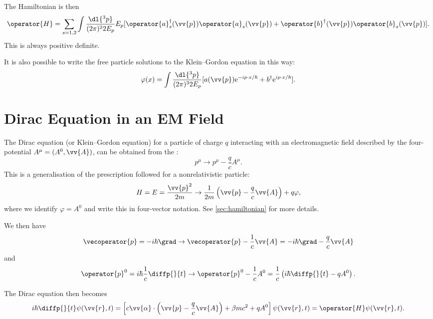 \documentclass[fleqn]{NotesClass}
\newcommand*{\e}{\mathrm{e}}
\newcommand*{\hermit}{\dagger}
\newcommand*{\hamiltonian}{H}
\begin{document}
    The Hamiltonian is then
    \begin{equation}
        \operator{\hamiltonian} = \sum_{s = 1, 2} \int \frac{\dl{^3p}}{(2\pi)^2 2E_p} E_p[\operator{a}_s^\hermit(\vv{p}) \operator{a}_s(\vv{p}) + \operator{b}^\hermit(\vv{p})\operator{b}_s(\vv{p})].
    \end{equation}
    This is always positive definite.
    
    It is also possible to write the free particle solutions to the Klein--Gordon equation in this way:
    \begin{equation}
        \varphi(x) = \int \frac{\dl{^3p}}{(2\pi)^32E_p} [a(\vv{p}) \e^{-ip\cdot x/\hbar} + b^\hermit \e^{ip\cdot x/\hbar}].
    \end{equation}
    
    \chapter{Dirac Equation in an EM Field}
    The Dirac equation (or Klein--Gordon equation) for a particle of charge \(q\) interacting with an electromagnetic field described by the four-potential \(A^\mu = (A^0, \vv{A})\), can be obtained from the :
    \begin{equation}
        p^\mu \to p^\mu - \frac{q}{c}A^\mu.
    \end{equation}
    This is a generalisation of the prescription followed for a nonrelativistic particle:
    \begin{equation}
        H = E = \frac{\vv{p}^2}{2m} \to \frac{1}{2m}\left( \vv{p} - \frac{q}{c}\vv{A} \right) + q\varphi,
    \end{equation}
    where we identify \(\varphi = A^0\) and write this in four-vector notation.
    See \cref{sec:hamiltonian} for more details.
    
    We then have
    \begin{equation}
        \vecoperator{p} = -i\hbar\grad \to \vecoperator{p} - \frac{1}{c}\vv{A} = -i\hbar\grad - \frac{q}{c}\vv{A}
    \end{equation}
    and
    \begin{equation}
        \operator{p}^0 = i\hbar\frac{1}{c}\diffp{}{t} \to \operator{p}^0 - \frac{1}{c}A^0 = \frac{1}{c}\left( i\hbar\diffp{}{t} - qA^0 \right).
    \end{equation}
    
    The Dirac equation then becomes
    \begin{equation}
        i\hbar\diffp{}{t} \psi(\vv{r}, t) = \left[ c\vv{\alpha} \cdot \left( \vv{p} - \frac{q}{c}\vv{A} \right) + \beta mc^2 + qA^0 \right] \psi(\vv{r}, t) = \operator{\hamiltonian}\psi(\vv{r}, t).
    \end{equation}
    
\end{document}
